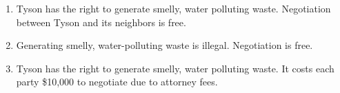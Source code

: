 \documentclass{article}
\begin{document}
\begin{enumerate}
	\begin{enumerate}
	
	\item Tyson has the right to generate smelly, water polluting waste. Negotiation between Tyson and its neighbors is free.
	
	\item Generating smelly, water-polluting waste is illegal. Negotiation is free.
	
	\item Tyson has the right to generate smelly, water polluting waste. It costs each party \$10,000 to negotiate due to attorney fees.
	
	\end{enumerate}

\end{enumerate}
\end{document}
